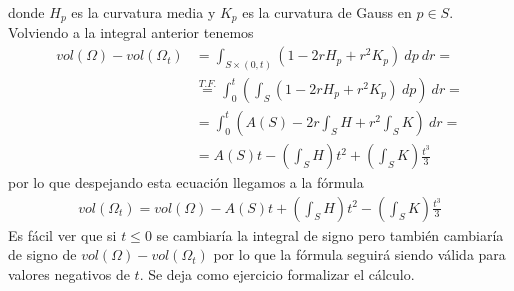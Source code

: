 \begin{ejemplo}
\begin{solucion}
        donde $H_p$ es la curvatura media y $K_p$ es la curvatura de Gauss en $p\in S$. Volviendo a la integral anterior tenemos
        \begin{align*}
            vol(\Omega) - vol(\Omega_t) &= 
            \int_{S\times(0,t)} (1-2rH_p+r^2K_p)\ dp\ dr=\\
            &\overset{T.F.}{=} 
            \int_0^t \left(\int_S (1-2rH_p + r^2K_p)\ dp \right)\ dr=\\
            &=
            \int_0^t\left(A(S) - 2r\int_S H + r^2\int_S K\right)\ dr =\\
            &=
            A(S)t - \left(\int_S H\right)t^2 + \left(\int_S K\right)\frac{t^3}{3}
        \end{align*}
        por lo que despejando esta ecuación llegamos a la fórmula
        \begin{gather*}
            \boxed{
                vol(\Omega_t) = 
                vol(\Omega) - A(S)t + \left(\int_S H\right)t^2 - \left(\int_S K\right)\frac{t^3}{3}
            }
        \end{gather*}
        Es fácil ver que si $t\leq 0$ se cambiaría la integral de signo pero también cambiaría de signo de $vol(\Omega) - vol(\Omega_t)$ por lo que la fórmula seguirá siendo válida para valores negativos de $t$. Se deja como ejercicio formalizar el cálculo.
    \end{solucion}
\end{ejemplo}